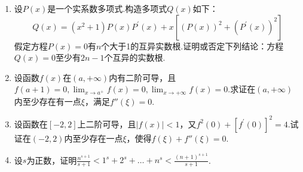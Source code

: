 \begin{enumerate}
	\item 设$P(x)$是一个实系数多项式.构造多项式$Q(x)$如下：
	\[Q ( x ) = \left( x ^ { 2 } + 1 \right) P ( x ) P ^ { \prime } ( x ) + x \left[ ( P ( x ) ) ^ { 2 } + \left( P ^ { \prime } ( x ) \right) ^ { 2 } \right]\]
	假定方程$P(x)=0$有$n$个大于1的互异实数根.证明或否定下列结论：方程$Q(x)=0$至少有$2n-1$个互异的实数根.
	\item 设函数$f(x)$在$(a,+\infty)$内有二阶可导，且$f ( a + 1 ) = 0 , \lim _ { x \rightarrow a ^ { + } } f ( x ) = 0 , \lim _ { x \rightarrow + \infty } f ( x ) = 0$.求证在$(a,+\infty)$内至少存在有一点$\xi $，满足$f''(\xi )=0$.
	\item 设函数在$[-2,2]$上二阶可导，且$|f(x)|<1$，又$f ^ { 2 } ( 0 ) + \left[ f ^ { \prime } ( 0 ) \right] ^ { 2 } = 4$.试证在$(-2,2)$内至少存在一点$\xi $，使得$f(\xi )+f''(\xi)=0$.
	\item 设$s$为正数，证明$\frac { n ^ { s + 1 } } { s + 1 } < 1 ^ { s } + 2 ^ { s } + \dots + n ^ { s } < \frac { ( n + 1 ) ^ { s + 1 } } { s + 1 }$.


\end{enumerate}
